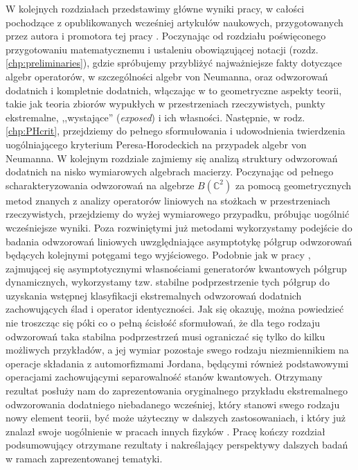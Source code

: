 W kolejnych rozdziałach przedstawimy główne wyniki pracy,
w całości pochodzące z opublikowanych wcześniej artykułów naukowych,
przygotowanych przez autora i promotora tej pracy
\cite{miller2014horodeckis,miller2015stable,miller2015topology}.
Poczynając od rozdziału poświęconego przygotowaniu matematycznemu i ustaleniu
obowiązującej notacji (rozdz. \ref{chp:preliminaries}),
gdzie spróbujemy przybliżyć najważniejsze fakty dotyczące algebr operatorów,
w szczególności algebr von Neumanna,
oraz odwzorowań dodatnich i kompletnie dodatnich,
włączając w to geometryczne aspekty teorii,
takie jak teoria zbiorów wypukłych w przestrzeniach rzeczywistych,
punkty ekstremalne, ,,wystające'' (\emph{exposed}) i ich własności.
Następnie,
w rodz. \ref{chp:PHcrit},
przejdziemy do pełnego sformułowania i udowodnienia twierdzenia
uogólniającego kryterium Peresa-Horodeckich na przypadek algebr von Neumanna.
W kolejnym rozdziale zajmiemy się analizą struktury odwzorowań dodatnich na
nisko wymiarowych algebrach macierzy.
Poczynając od pełnego scharakteryzowania odwzorowań na algebrze
$B(\mathbb{C}^{2})$ za pomocą geometrycznych metod znanych z analizy
operatorów liniowych na stożkach w przestrzeniach rzeczywistych,
przejdziemy do wyżej wymiarowego przypadku,
próbując uogólnić wcześniejsze wyniki.
Poza rozwiniętymi już metodami wykorzystamy podejście do badania odwzorowań
liniowych uwzględniające asymptotykę półgrup odwzorowań będących
kolejnymi potęgami tego wyjściowego.
Podobnie jak w pracy
\cite{olkiewicz1999environment},
zajmującej się asymptotycznymi własnościami generatorów kwantowych półgrup
dynamicznych,
wykorzystamy tzw. stabilne podprzestrzenie tych półgrup do uzyskania
wstępnej klasyfikacji ekstremalnych odwzorowań dodatnich 
zachowujących ślad i operator identyczności.
Jak się okazuję,
można powiedzieć nie troszcząc się póki co o pełną ścisłość sformułowań,
że dla tego rodzaju odwzorowań taka stabilna podprzestrzeń musi ograniczać się
tylko do kilku możliwych przykładów,
a jej wymiar pozostaje swego rodzaju niezmiennikiem na operacje składania
z automorfizmami Jordana,
będącymi również podstawowymi operacjami zachowującymi separowalność stanów
kwantowych.
Otrzymany rezultat posłuży nam do zaprezentowania oryginalnego przykładu
ekstremalnego odwzorowania dodatniego niebadanego wcześniej,
który stanowi swego rodzaju nowy element teorii,
być może użyteczny w dalszych zastosowaniach,
i który już znalazł swoje uogólnienie w pracach innych fizyków
\cite{rutkowski2015class}.
Pracę kończy rozdział podsumowujący otrzymane rezultaty i nakreślający
perspektywy dalszych badań w ramach zaprezentowanej tematyki.

